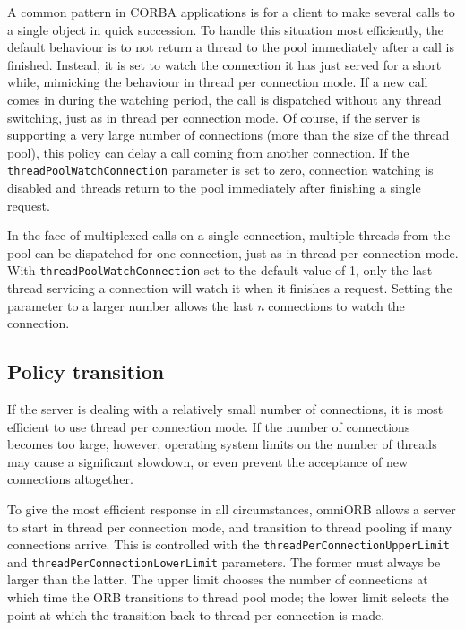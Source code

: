 \documentclass[draft,11pt,twoside,a4paper]{book}
\newcommand{\code}[1]{\texttt{#1}}
\newcommand{\dsc}{\discretionary{}{}{}}
\begin{document}
A common pattern in CORBA applications is for a client to make several
calls to a single object in quick succession. To handle this situation
most efficiently, the default behaviour is to not return a thread to
the pool immediately after a call is finished. Instead, it is set to
watch the connection it has just served for a short while, mimicking
the behaviour in thread per connection mode. If a new call comes in
during the watching period, the call is dispatched without any thread
switching, just as in thread per connection mode. Of course, if the
server is supporting a very large number of connections (more than the
size of the thread pool), this policy can delay a call coming from
another connection. If the \code{threadPoolWatch\dsc{}Connection}
parameter is set to zero, connection watching is disabled and threads
return to the pool immediately after finishing a single request.

In the face of multiplexed calls on a single connection, multiple
threads from the pool can be dispatched for one connection, just as in
thread per connection mode. With \code{threadPoolWatchConnection} set
to the default value of 1, only the last thread servicing a connection
will watch it when it finishes a request. Setting the parameter to a
larger number allows the last \emph{n} connections to watch the
connection.


\subsection{Policy transition}

If the server is dealing with a relatively small number of
connections, it is most efficient to use thread per connection mode.
If the number of connections becomes too large, however, operating
system limits on the number of threads may cause a significant
slowdown, or even prevent the acceptance of new connections
altogether.

To give the most efficient response in all circumstances, omniORB
allows a server to start in thread per connection mode, and transition
to thread pooling if many connections arrive. This is controlled with
the \code{threadPerConnection\dsc{}UpperLimit} and
\code{threadPerConnectionLowerLimit} parameters. The former must
always be larger than the latter. The upper limit chooses the number
of connections at which time the ORB transitions to thread pool mode;
the lower limit selects the point at which the transition back to
thread per connection is made.
\end{document}
